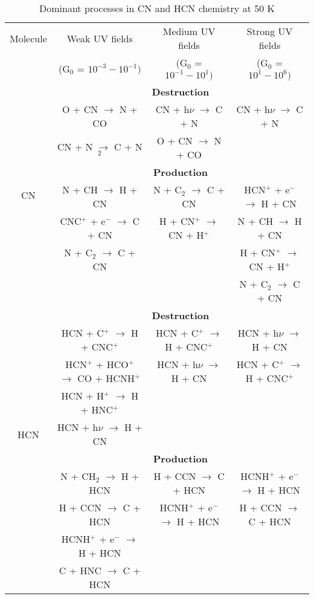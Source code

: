 \documentclass{aa}
\begin{document}
\begin{table*} 
\caption{Dominant processes in CN and HCN chemistry at 50 K} 
\centering %
\label{reactions_50} 

\begin{tabular}{c c c c} 
\hline\hline 
Molecule & Weak UV fields & Medium UV fields & Strong UV fields \\ 
& (G$_0$ = $10^{-3} - 10^{-1})$ & (G$_0$ = $10^{-1} - 10^{1})$ & (G$_0$ = $10^{1} - 10^{6})$ \\ 
\hline 
\multirow{8}{*}{CN} & \multicolumn{3}{c}{\textbf{Destruction}}\\ 
& O + CN $\rightarrow$ N + CO & CN + h$\nu$ $\rightarrow$ C + N & CN + h$\nu$ $\rightarrow$ C + N\\ 
& CN + N $\rightarrow$ C + N$_2$ & O + CN $\rightarrow$ N + CO & \\
\vspace{2.5 pt} &\multicolumn{3}{c}{\textbf{Production}}\\ 
&N + CH $\rightarrow$ H + CN & N + C$_2$ $\rightarrow$ C + CN & HCN$^+$ + e$^-$ $\rightarrow$ H + CN\\
&CNC$^+$ + e$^-$ $\rightarrow$ C + CN & H + CN$^+$ $\rightarrow$ CN + H$^+$ & N + CH $\rightarrow$ H + CN\\
&N + C$_2$ $\rightarrow$ C + CN & & H + CN$^+$ $\rightarrow$ CN + H$^+$\\ & & & N + C$_2$ $\rightarrow$ C + CN\\
\hline
\multirow{9}{*}{HCN} & \multicolumn{3}{c}{\textbf{Destruction}}\\ 
&HCN + C$^+$ $\rightarrow$ H + CNC$^+$ & HCN + C$^+$ $\rightarrow$ H + CNC$^+$ & HCN + h$\nu$ $\rightarrow$ H + CN\\
&HCN$^+$ + HCO$^+$ $\rightarrow$ CO + HCNH$^+$ &HCN + h$\nu$ $\rightarrow$ H + CN & HCN + C$^+$ $\rightarrow$ H + CNC$^+$\\
&HCN + H$^+$ $\rightarrow$ H + HNC$^+$ & & \\
&HCN + h$\nu$ $\rightarrow$ H + CN & & \\
\vspace{2.5 pt} 
&\multicolumn{3}{c}{\textbf{Production}}\\ 
&N + CH$_2$ $\rightarrow$ H + HCN & H + CCN $\rightarrow$ C + HCN & HCNH$^+$ + e$^-$ $\rightarrow$ H + HCN\\
&H + CCN $\rightarrow$ C + HCN & HCNH$^+$ + e$^-$ $\rightarrow$ H + HCN & H + CCN $\rightarrow$ C + HCN\\
&HCNH$^+$ + e$^-$ $\rightarrow$ H + HCN & & \\ 
&C + HNC $\rightarrow$ C + HCN & & \\ 
\hline \end{tabular} 
\end{table*}
\end{document}
